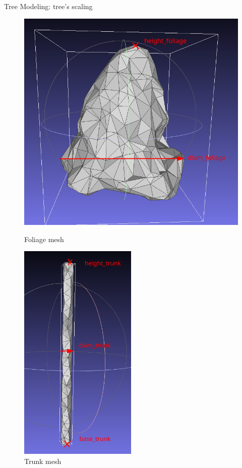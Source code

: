 \documentclass[10pt]{beamer}
\begin{document}
\begin{frame}{Tree Modeling: tree's scaling}
	\begin{figure}[h]
		\centering
		\begin{minipage}{0.49\textwidth}
			\centering
			\includegraphics[width=\textwidth]{images/foliage_arrows.png}
			\caption{Foliage mesh}
			\label{fig:figure1}
		\end{minipage}\hfill
		\begin{minipage}{0.49\textwidth}
			\centering
			\includegraphics[width=0.5\textwidth]{images/trunk_arrows.png}
			\caption{Trunk mesh}
			\label{fig:figure2}
		\end{minipage}
	\end{figure}
\end{frame}
\end{document}

